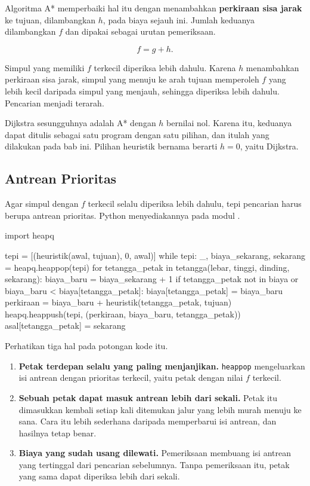 Algoritma A* memperbaiki hal itu dengan menambahkan \textbf{perkiraan sisa
jarak} ke tujuan, dilambangkan $h$, pada biaya sejauh ini. Jumlah keduanya
dilambangkan $f$ dan dipakai sebagai urutan pemeriksaan.

\begin{equation}
\label{eq:f-gh}
f = g + h .
\end{equation}

Simpul yang memiliki $f$ terkecil diperiksa lebih dahulu. Karena $h$
menambahkan perkiraan sisa jarak, simpul yang menuju ke arah tujuan memperoleh
$f$ yang lebih kecil daripada simpul yang menjauh, sehingga diperiksa lebih
dahulu. Pencarian menjadi terarah.

\begin{catatabox}
Dijkstra sesungguhnya adalah A* dengan $h$ bernilai nol.
Karena itu, keduanya dapat ditulis sebagai satu program dengan satu pilihan,
dan itulah yang dilakukan pada bab ini. Pilihan heuristik bernama
 berarti $h = 0$, yaitu Dijkstra.
\end{catatabox}

\subsection{Antrean Prioritas}

Agar simpul dengan $f$ terkecil selalu diperiksa lebih dahulu, tepi pencarian
harus berupa antrean prioritas. Python menyediakannya pada modul
.

\begin{kodekeluaran}
import heapq

tepi = [(heuristik(awal, tujuan), 0, awal)]
while tepi:
    _, biaya_sekarang, sekarang = heapq.heappop(tepi)
    for tetangga_petak in tetangga(lebar, tinggi, dinding, sekarang):
        biaya_baru = biaya_sekarang + 1
        if tetangga_petak not in biaya or biaya_baru < biaya[tetangga_petak]:
            biaya[tetangga_petak] = biaya_baru
            perkiraan = biaya_baru + heuristik(tetangga_petak, tujuan)
            heapq.heappush(tepi, (perkiraan, biaya_baru, tetangga_petak))
            asal[tetangga_petak] = sekarang
\end{kodekeluaran}

Perhatikan tiga hal pada potongan kode itu.

\begin{enumerate}
  \item \textbf{Petak terdepan selalu yang paling menjanjikan.}
        \texttt{heappop} mengeluarkan isi antrean dengan prioritas terkecil,
        yaitu petak dengan nilai $f$ terkecil.
  \item \textbf{Sebuah petak dapat masuk antrean lebih dari sekali.} Petak itu
        dimasukkan kembali setiap kali ditemukan jalur yang lebih murah
        menuju ke sana. Cara itu lebih sederhana daripada memperbarui isi
        antrean, dan hasilnya tetap benar.
  \item \textbf{Biaya yang sudah usang dilewati.} Pemeriksaan
         membuang isi antrean
        yang tertinggal dari pencarian sebelumnya. Tanpa pemeriksaan itu,
        petak yang sama dapat diperiksa lebih dari sekali.
\end{enumerate}

